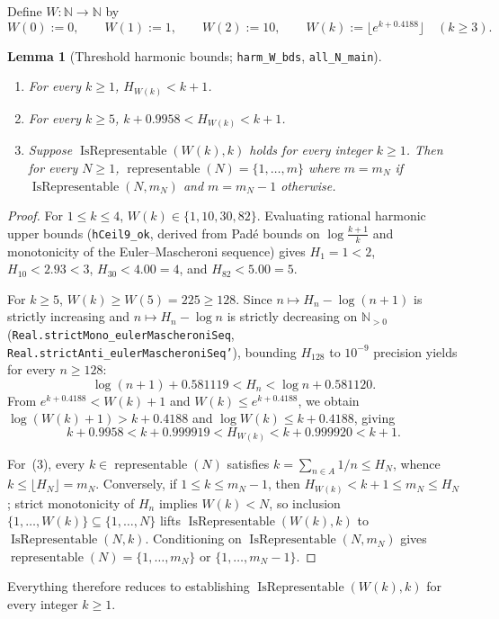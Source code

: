 \documentclass[11pt,a4paper]{amsart}
\newtheorem{lemma}{Lemma}
\theoremstyle{remark}
\newcommand{\Rep}{\operatorname{IsRepresentable}}
\newcommand{\repSet}{\operatorname{representable}}
\begin{document}
Define $W : \mathbb{N} \to \mathbb{N}$ by
\[
W(0) := 0, \qquad W(1) := 1, \qquad W(2) := 10, \qquad W(k) := \lfloor e^{k + 0.4188} \rfloor \quad (k \ge 3).
\]

\begin{lemma}[Threshold harmonic bounds; \texttt{harm\_W\_bds}, \texttt{all\_N\_main}]\label{lem:W}
\begin{enumerate}
\item For every $k \ge 1$, $H_{W(k)} < k + 1$.
\item For every $k \ge 5$, $k + 0.9958 < H_{W(k)} < k + 1$.
\item Suppose $\Rep(W(k), k)$ holds for every integer $k \ge 1$. Then for every $N \ge 1$, $\repSet(N) = \{1, \dots, m\}$ where $m = m_N$ if $\Rep(N, m_N)$ and $m = m_N - 1$ otherwise.
\end{enumerate}
\end{lemma}

\begin{proof}
For $1 \le k \le 4$, $W(k) \in \{1, 10, 30, 82\}$. Evaluating rational harmonic upper bounds (\texttt{hCeil9\_ok}, derived from Pad\'e bounds on $\log\frac{k+1}{k}$ and monotonicity of the Euler--Mascheroni sequence) gives $H_1 = 1 < 2$, $H_{10} < 2.93 < 3$, $H_{30} < 4.00 = 4$, and $H_{82} < 5.00 = 5$.

For $k \ge 5$, $W(k) \ge W(5) = 225 \ge 128$. Since $n \mapsto H_n - \log(n + 1)$ is strictly increasing and $n \mapsto H_n - \log n$ is strictly decreasing on $\mathbb{N}_{>0}$ (\texttt{Real.strictMono\_eulerMascheroniSeq}, \texttt{Real.strictAnti\_eulerMascheroniSeq'}), bounding $H_{128}$ to $10^{-9}$ precision yields for every $n \ge 128$:
\[
\log(n + 1) + 0.581119 < H_n < \log n + 0.581120.
\]
From $e^{k + 0.4188} < W(k) + 1$ and $W(k) \le e^{k + 0.4188}$, we obtain $\log(W(k) + 1) > k + 0.4188$ and $\log W(k) \le k + 0.4188$, giving
\[
k + 0.9958 < k + 0.999919 < H_{W(k)} < k + 0.999920 < k + 1.
\]

For~(3), every $k \in \repSet(N)$ satisfies $k = \sum_{n \in A} 1/n \le H_N$, whence $k \le \lfloor H_N \rfloor = m_N$. Conversely, if $1 \le k \le m_N - 1$, then $H_{W(k)} < k + 1 \le m_N \le H_N$; strict monotonicity of $H_n$ implies $W(k) < N$, so inclusion $\{1, \dots, W(k)\} \subseteq \{1, \dots, N\}$ lifts $\Rep(W(k), k)$ to $\Rep(N, k)$. Conditioning on $\Rep(N, m_N)$ gives $\repSet(N) = \{1, \dots, m_N\}$ or $\{1, \dots, m_N - 1\}$.
\end{proof}

Everything therefore reduces to establishing $\Rep(W(k), k)$ for every integer $k \ge 1$.
\end{document}
